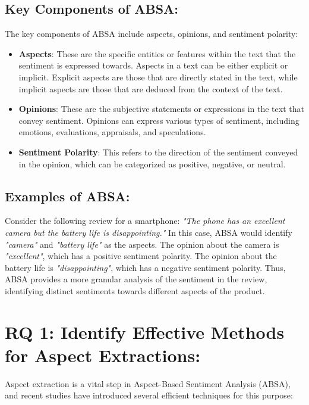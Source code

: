 \documentclass{article}
\begin{document}
\subsection{Key Components of ABSA:}
The key components of ABSA include aspects, opinions, and sentiment polarity:
\begin{itemize}
  \item \textbf{Aspects}: These are the specific entities or features within the text that the sentiment is expressed towards. Aspects in a text can be either explicit or implicit. Explicit aspects are those that are directly stated in the text, while implicit aspects are those that are deduced from the context of the text.\cite{hua2023systematic} \cite{NazirIssues&Chall2023}
  \item \textbf{Opinions}: These are the subjective statements or expressions in the text that convey sentiment. Opinions can express various types of sentiment, including emotions, evaluations, appraisals, and speculations.\cite{hua2023systematic}
  \item \textbf{Sentiment Polarity}: This refers to the direction of the sentiment conveyed in the opinion, which can be categorized as positive, negative, or neutral.\cite{hua2023systematic}\cite{NazirIssues&Chall2023}
\end{itemize}

\subsection{Examples of ABSA: }
Consider the following review for a smartphone: \textit{"The phone has an excellent camera but the battery life is disappointing."} In this case, ABSA would identify \textit{"camera"} and \textit{"battery life"} as the aspects. The opinion about the camera is \textit{"excellent"}, which has a positive sentiment polarity. The opinion about the battery life is \textit{"disappointing"}, which has a negative sentiment polarity. Thus, ABSA provides a more granular analysis of the sentiment in the review, identifying distinct sentiments towards different aspects of the product.\cite{hua2023systematic}

\section{RQ 1: Identify Effective Methods for Aspect Extractions: }

Aspect extraction is a vital step in Aspect-Based Sentiment Analysis (ABSA), and recent studies have introduced several efficient techniques for this purpose:
\end{document}
